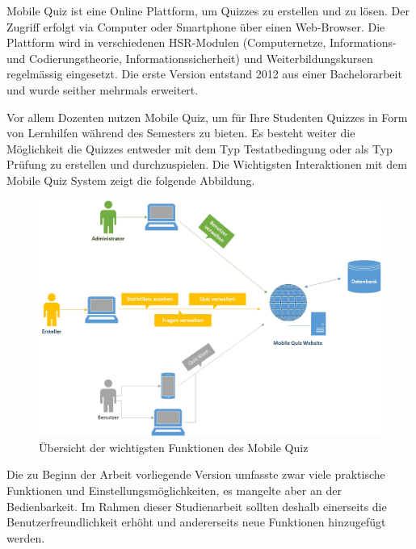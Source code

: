 
Mobile Quiz ist eine Online Plattform, um Quizzes zu erstellen und zu lösen. Der Zugriff erfolgt via Computer oder Smartphone über einen Web-Browser. Die Plattform wird in verschiedenen HSR-Modulen (Computernetze, Informations- und Codierungstheorie, Informationssicherheit) und Weiterbildungskursen regelmässig eingesetzt. Die erste Version entstand 2012 aus einer Bachelorarbeit und wurde seither mehrmals erweitert. 

\bigskip

Vor allem Dozenten nutzen Mobile Quiz, um für Ihre Studenten Quizzes in Form von Lernhilfen während des Semesters zu bieten. Es besteht weiter die Möglichkeit die Quizzes entweder mit dem Typ Testatbedingung oder als Typ Prüfung zu erstellen und durchzuspielen. Die Wichtigsten Interaktionen mit dem Mobile Quiz System zeigt die folgende Abbildung.

\begin{figure}[H]
	\centering
	\includegraphics[width=1\textwidth]
	{Images/InteraktionMobileQuiz.jpg}
	\caption{Übersicht der wichtigsten Funktionen des Mobile Quiz}
\end{figure}

\bigskip
Die zu Beginn der Arbeit vorliegende Version umfasste zwar viele praktische Funktionen und Einstellungsmöglichkeiten, es mangelte aber an der Bedienbarkeit. Im Rahmen dieser Studienarbeit sollten deshalb einerseits die Benutzerfreundlichkeit erhöht und andererseits neue Funktionen hinzugefügt werden.

\bigskip

